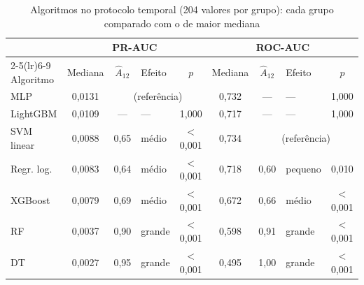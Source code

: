 \begin{table}[htbp]
    
    \centering
    \scriptsize
    \setlength{\tabcolsep}{3pt}%
    \caption{Algoritmos no protocolo temporal (204 valores por grupo): cada grupo comparado com o de maior mediana}
    \label{tab:res-a12-fatores-algoritmo}
    \begin{tabular}{lcclc|cclc}
        \toprule
         & \multicolumn{4}{c|}{PR-AUC} & \multicolumn{4}{c}{ROC-AUC} \\
        \cmidrule(lr){2-5}\cmidrule(lr){6-9}
        Algoritmo & Mediana & $\hat{A}_{12}$ & Efeito & $p$ & Mediana & $\hat{A}_{12}$ & Efeito & $p$ \\
        \midrule
        MLP & 0,0131 & \multicolumn{3}{c}{(referência)} & 0,732 & --- & --- & 1,000 \\
        LightGBM & 0,0109 & --- & --- & 1,000 & 0,717 & --- & --- & 1,000 \\
        SVM linear & 0,0088 & 0,65 & médio & $<$ 0,001 & 0,734 & \multicolumn{3}{c}{(referência)} \\
        Regr. log. & 0,0083 & 0,64 & médio & $<$ 0,001 & 0,718 & 0,60 & pequeno & 0,010 \\
        XGBoost & 0,0079 & 0,69 & médio & $<$ 0,001 & 0,672 & 0,66 & médio & $<$ 0,001 \\
        RF & 0,0037 & 0,90 & grande & $<$ 0,001 & 0,598 & 0,91 & grande & $<$ 0,001 \\
        DT & 0,0027 & 0,95 & grande & $<$ 0,001 & 0,495 & 1,00 & grande & $<$ 0,001 \\
        \bottomrule
    \end{tabular}
\end{table}%
